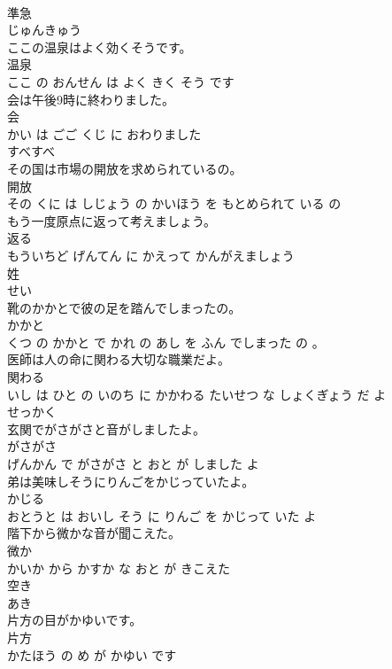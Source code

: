 \documentclass[8pt]{extreport}
\begin{document}
\begin{CJK}{UTF8}{min}
\\	準急	
\\	じゅんきゅう		
\\	ここの温泉はよく効くそうです。	
\\	温泉 
\\	ここ の おんせん は よく きく そう です			
\\	会は午後9時に終わりました。	
\\	会 
\\	かい は ごご くじ に おわりました			
\\	すべすべ	
\\	その国は市場の開放を求められているの。	
\\	開放 
\\	その くに は しじょう の かいほう を もとめられて いる の			
\\	もう一度原点に返って考えましょう。	
\\	返る 
\\	もういちど げんてん に かえって かんがえましょう			
\\	姓	
\\	せい		
\\	靴のかかとで彼の足を踏んでしまったの。	
\\	かかと 
\\	くつ の かかと で かれ の あし を ふん でしまった の 。			
\\	医師は人の命に関わる大切な職業だよ。	
\\	関わる 
\\	いし は ひと の いのち に かかわる たいせつ な しょくぎょう だ よ			
\\	せっかく	
\\	玄関でがさがさと音がしましたよ。	
\\	がさがさ 
\\	げんかん で がさがさ と おと が しました よ			
\\	弟は美味しそうにりんごをかじっていたよ。	
\\	かじる 
\\	おとうと は おいし そう に りんご を かじって いた よ			
\\	階下から微かな音が聞こえた。	
\\	微か 
\\	かいか から かすか な おと が きこえた			
\\	空き	
\\	あき		
\\	片方の目がかゆいです。	
\\	片方 
\\	かたほう の め が かゆい です			

\end{CJK}
\end{document}
